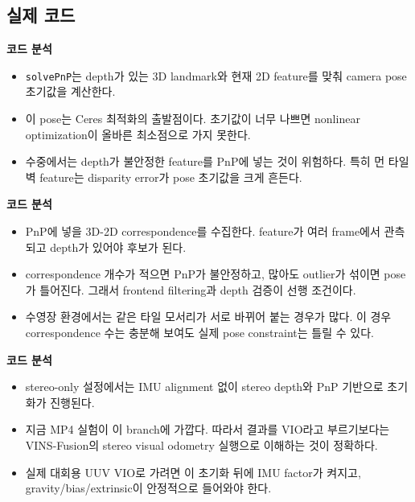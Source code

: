 \documentclass[11pt,a4paper]{article}
\newcommand{\code}[1]{\texttt{#1}}
\newcommand{\codeheading}[1]{\par\vspace{6pt}\noindent{\footnotesize\bfseries\textcolor{codeemph}{#1}}\par\vspace{2pt}}
\newcommand{\readpoint}[1]{\par\noindent{\footnotesize\textcolor{muted}{읽는 포인트: #1}}\par\vspace{2pt}}
\newenvironment{codeanalysis}{%
  \par\vspace{2pt}\noindent
  {\footnotesize\bfseries\textcolor{accentblue}{코드 분석}}\par
  \begin{itemize}[leftmargin=1.35em,topsep=2pt,itemsep=1pt,parsep=0pt]
  \footnotesize
}{%
  \end{itemize}
  \vspace{6pt}
}
\begin{document}
\subsection*{실제 코드}

\readpoint{이미 depth가 있는 feature를 3D point로 쓰고, 현재 frame의 2D 관측과 맞춰 pose 초기값을 만든다.}
\codeheading{feature\_manager.cpp:215--238}

\begin{codeanalysis}
  \item \code{solvePnP}는 depth가 있는 3D landmark와 현재 2D feature를 맞춰 camera pose 초기값을 계산한다.
  \item 이 pose는 Ceres 최적화의 출발점이다. 초기값이 너무 나쁘면 nonlinear optimization이 올바른 최소점으로 가지 못한다.
  \item 수중에서는 depth가 불안정한 feature를 PnP에 넣는 것이 위험하다. 특히 먼 타일 벽 feature는 disparity error가 pose 초기값을 크게 흔든다.
\end{codeanalysis}

\codeheading{feature\_manager.cpp:259--300}

\begin{codeanalysis}
  \item PnP에 넣을 3D-2D correspondence를 수집한다. feature가 여러 frame에서 관측되고 depth가 있어야 후보가 된다.
  \item correspondence 개수가 적으면 PnP가 불안정하고, 많아도 outlier가 섞이면 pose가 틀어진다. 그래서 frontend filtering과 depth 검증이 선행 조건이다.
  \item 수영장 환경에서는 같은 타일 모서리가 서로 바뀌어 붙는 경우가 많다. 이 경우 correspondence 수는 충분해 보여도 실제 pose constraint는 틀릴 수 있다.
\end{codeanalysis}

\codeheading{estimator.cpp:508--522}

\begin{codeanalysis}
  \item stereo-only 설정에서는 IMU alignment 없이 stereo depth와 PnP 기반으로 초기화가 진행된다.
  \item 지금 MP4 실험이 이 branch에 가깝다. 따라서 결과를 VIO라고 부르기보다는 VINS-Fusion의 stereo visual odometry 실행으로 이해하는 것이 정확하다.
  \item 실제 대회용 UUV VIO로 가려면 이 초기화 뒤에 IMU factor가 켜지고, gravity/bias/extrinsic이 안정적으로 들어와야 한다.
\end{codeanalysis}
\end{document}
